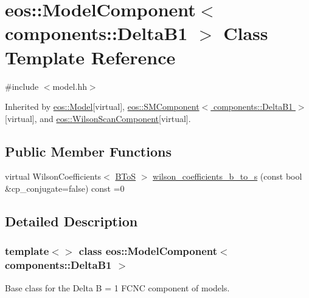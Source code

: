 \hypertarget{classeos_1_1ModelComponent_3_01components_1_1DeltaB1_01_4}{
\section{eos::ModelComponent$<$ components::DeltaB1 $>$ Class Template Reference}
\label{classeos_1_1ModelComponent_3_01components_1_1DeltaB1_01_4}
}


{\ttfamily \#include $<$model.hh$>$}

Inherited by \hyperlink{classeos_1_1Model}{eos::Model}{\ttfamily  \mbox{[}virtual\mbox{]}}, \hyperlink{classeos_1_1SMComponent_3_01components_1_1DeltaB1_01_4}{eos::SMComponent$<$ components::DeltaB1 $>$}{\ttfamily  \mbox{[}virtual\mbox{]}}, and \hyperlink{classeos_1_1WilsonScanComponent}{eos::WilsonScanComponent}{\ttfamily  \mbox{[}virtual\mbox{]}}.\subsection*{Public Member Functions}
\begin{DoxyCompactItemize}
\item 
virtual WilsonCoefficients$<$ \hyperlink{structeos_1_1BToS}{BToS} $>$ \hyperlink{classeos_1_1ModelComponent_3_01components_1_1DeltaB1_01_4_a94a836d0f2518023cca37a1ffaa128e9}{wilson\_\-coefficients\_\-b\_\-to\_\-s} (const bool \&cp\_\-conjugate=false) const =0
\end{DoxyCompactItemize}


\subsection{Detailed Description}
\subsubsection*{template$<$$>$ class eos::ModelComponent$<$ components::DeltaB1 $>$}

Base class for the Delta B = 1 FCNC component of models. 

